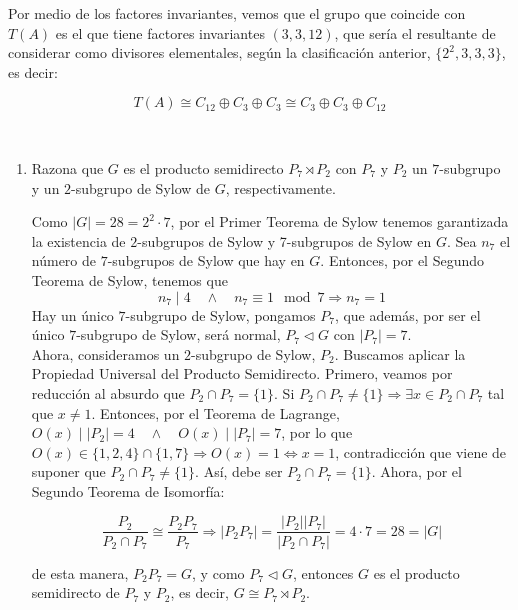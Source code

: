 \documentclass[12pt]{article}
\begin{document}
\begin{ejercicio}
\begin{enumerate}[label=(\alph*)]
            Por medio de los factores invariantes, vemos que el grupo que coincide con $T(A)$ es el que tiene factores invariantes $(3,3,12)$, que sería el resultante de considerar como divisores elementales, según la clasificación anterior, $\{2^2, 3, 3, 3\}$, es decir:

            $$T(A) \cong C_{12} \oplus C_3 \oplus C_3 \cong C_3 \oplus C_3 \oplus C_{12}$$

        \end{enumerate}
    \end{ejercicio}

    \begin{ejercicio}~
        \begin{enumerate}[label=(\alph*)]
            \item Razona que $G$ es el producto semidirecto $P_7 \rtimes P_2$ con $P_7$ y $P_2$ un $7$-subgrupo y un $2$-subgrupo de Sylow de $G$, respectivamente.
            
            Como $|G| = 28 = 2^2 \cdot 7$, por el Primer Teorema de Sylow tenemos garantizada la existencia de $2$-subgrupos de Sylow y 7-subgrupos de Sylow en $G$. Sea $n_7$ el número de $7$-subgrupos de Sylow que hay en $G$. Entonces, por el Segundo Teorema de Sylow, tenemos que
            $$n_7 \mid 4 \quad \land \quad n_7 \equiv 1 \mod 7 \Longrightarrow n_7 = 1$$
            Hay un único $7$-subgrupo de Sylow, pongamos $P_7$, que además, por ser el único $7$-subgrupo de Sylow, será normal, $P_7 \vartriangleleft G$ con $|P_7| = 7$. \\

            Ahora, consideramos un $2$-subgrupo de Sylow, $P_2$. Buscamos aplicar la Propiedad Universal del Producto Semidirecto. Primero, veamos por reducción al absurdo que $P_2 \cap P_7 = \{1\}$. 
            Si $P_2 \cap P_7 \neq \{1\} \Longrightarrow \exists x \in P_2 \cap P_7$ tal que $x \neq 1$. Entonces, por el Teorema de Lagrange, $O(x) \mid |P_2| = 4 \quad \land \quad O(x) \mid |P_7| = 7$, por lo que $O(x) \in \{1,2,4\} \cap \{1,7\} \Longrightarrow O(x) = 1 \iff x = 1$, 
            contradicción que viene de suponer que $P_2 \cap P_7 \neq \{1\}$. Así, debe ser $P_2 \cap P_7 = \{1\}$. Ahora, por el Segundo Teorema de Isomorfía:

            $$\dfrac{P_2}{P_2 \cap P_7} \cong \dfrac{P_2 P_7}{P_7} \Longrightarrow |P_2P_7| = \dfrac{|P_2| |P_7|}{|P_2 \cap P_7|} = 4 \cdot 7 = 28 = |G|$$

            de esta manera, $P_2 P_7 = G$, y como $P_7 \vartriangleleft G$, entonces $G$ es el producto semidirecto de $P_7$ y $P_2$, es decir, $G \cong P_7 \rtimes P_2$.


\end{enumerate}
\end{ejercicio}
\end{document}
